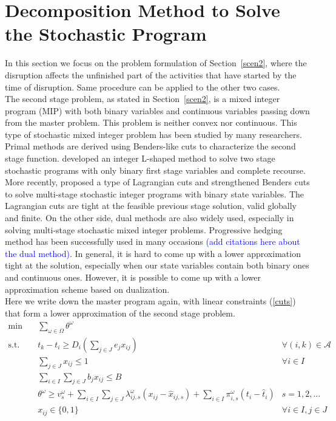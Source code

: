 \documentclass[11pt]{article}
\begin{document}
\section{Decomposition Method to Solve the Stochastic Program}
	In this section we focus on the problem formulation of Section~\ref{scen2}, where the disruption affects the unfinished part of the activities that have started by the time of disruption. Same procedure can be applied to the other two cases.\\
	\newline The second stage problem, as stated in Section~\ref{scen2}, is a mixed integer program (MIP) with both binary variables and continuous variables passing down from the master problem. This problem is neither convex nor continuous. This type of stochastic mixed integer problem has been studied by many researchers. Primal methods are derived using Benders-like cuts to characterize the second stage function. \cite{laporte1993integer} developed an integer L-shaped method to solve two stage stochastic programs with only binary first stage variables and complete recourse. More recently, \cite{zou2016nested} proposed a type of Lagrangian cuts and strengthened Benders cuts to solve multi-stage stochastic integer programs with binary state variables. The Lagrangian cuts are tight at the feasible previous stage solution, valid globally and finite. On the other side, dual methods are also widely used, especially in solving multi-stage stochastic mixed integer problems. Progressive hedging method has been successfully used in many occasions \textcolor{blue}{(add citations here about the dual method)}. In general, it is hard to come up with a lower approximation tight at the solution, especially when our state variables contain both binary ones and continuous ones. However, it is possible to come up with a lower approximation scheme based on dualization.\\
	\newline Here we write down the master program again, with linear constraints (\ref{cuts}) that form a lower approximation of the second stage problem. 
	\begin{align}
		\min \quad & \sum_{\omega \in \Omega} \theta^\omega &\\
		\text{s.t.} \quad & t_k - t_i \geq D_i(\sum_{j \in J} e_jx_{ij}) & \forall (i,k) \in \mathcal{A}\\
		& \sum_{j \in J} x_{ij} \leq 1 & \forall i \in I\\
		& \sum_{i \in I}\sum_{j \in J} b_jx_{ij} \leq B &\\
		& \theta^{\omega} \geq v_{s}^\omega + \sum_{i \in I}\sum_{j \in J}\lambda_{ij,s}^\omega (x_{ij} - \hat{x}_{ij,s}) + \sum_{i \in I} \pi_{i,s}^\omega(t_i - \hat{t}_i)& s = 1,2,\dots \label{cuts}\\
		& x_{ij} \in \{0,1\} & \forall i \in I, j \in J
	\end{align}
\end{document}
